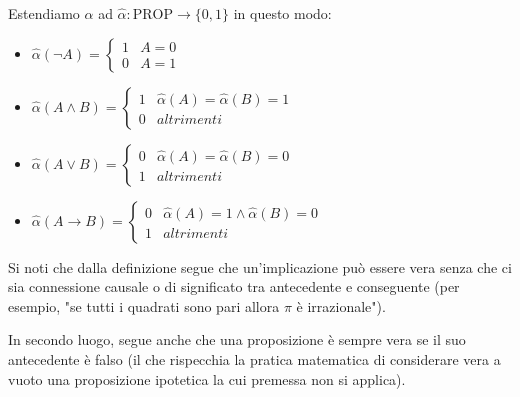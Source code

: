 \documentclass[a4paper,12pt]{report}
\begin{document}
    Estendiamo \( \alpha \) ad \( \hat{\alpha} : \text{PROP} \to \{0,1\} \) in questo modo:
            \vspace{0.5em}
    \begin{itemize}
        \item \( \hat{\alpha}(\neg A) = \begin{cases}
                1 &  A = 0 \\
                0 & A = 1
            \end{cases}\)

            \vspace{0.5em}

        \item \( \hat{\alpha}(A \land B) = \begin{cases}
                1 & \hat{\alpha}(A) = \hat{\alpha}(B)  = 1 \\
                0 & altrimenti
            \end{cases}\)

            \vspace{0.5em}

        \item \( \hat{\alpha}(A \lor B) = \begin{cases}
                0 & \hat{\alpha}(A) = \hat{\alpha}(B)  = 0 \\
                1 & altrimenti
            \end{cases}\)

            \vspace{0.5em}

        \item \( \hat{\alpha}(A \to B) = \begin{cases}
                0 & \hat{\alpha}(A) = 1 \land \hat{\alpha}(B)  = 0 \\
                1 & altrimenti
        \end{cases}\)

\end{itemize}

Si noti che dalla definizione segue che un'implicazione può essere vera senza che ci sia connessione causale o di significato tra antecedente e conseguente (per esempio, "se tutti i quadrati sono pari allora \( \pi \) è irrazionale"). 

In secondo luogo, segue anche che una proposizione è sempre vera se il suo antecedente è falso (il che rispecchia la pratica matematica di considerare vera a vuoto una proposizione ipotetica la cui premessa non si applica).
\end{document}
